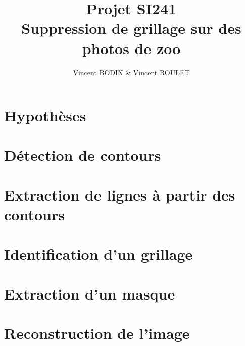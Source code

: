 \documentclass[10pt,a4paper]{article}
\title{Projet SI241 \\
Suppression de grillage sur des photos de zoo}
\author{Vincent BODIN \& Vincent ROULET}
\date{}
\begin{document}
\maketitle

\hrulefill
\vspace{2cm}
\renewcommand{\abstractname}{Résumé}
\begin{abstract}

\end{abstract}

\newpage
\tableofcontents
\newpage


\section{Hypothèses}


\section{Détection de contours}


\section{Extraction de lignes à partir des contours}


\section{Identification d'un grillage}


\section{Extraction d'un masque}


\section{Reconstruction de l'image}




\newpage



\end{document}

